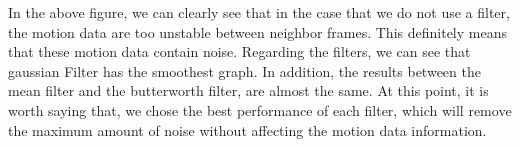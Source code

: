 In the above figure, we can clearly see that in the case that we do not use a filter, the motion data are too unstable between neighbor frames. This definitely means that these motion data contain noise. Regarding the filters, we can see that gaussian Filter has the smoothest graph. In addition, the results between the mean filter and the butterworth filter, are almost the same. At this point, it is worth saying that, we chose the best performance of each filter, which will remove the maximum amount of noise without affecting the motion data information.